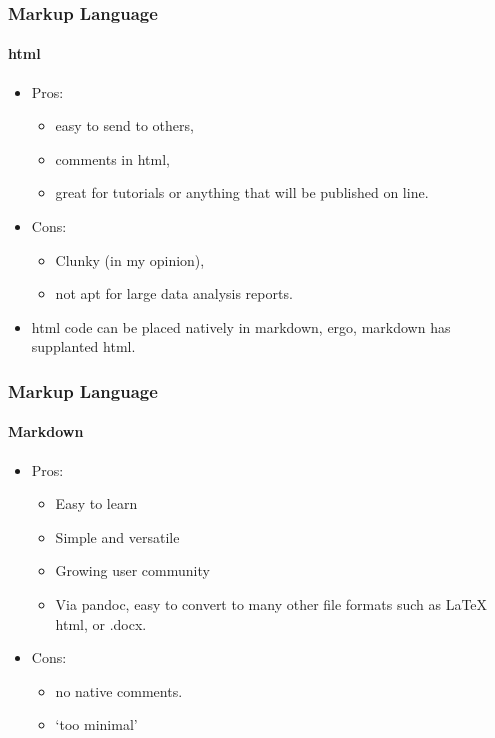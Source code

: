 \documentclass[t]{beamer}\usepackage[]{graphicx}\usepackage[]{color}
\begin{document}
\begin{frame}
  \frametitle{Markup Language}
  \framesubtitle{html}
  \begin{itemize}
    \item Pros: 
      \begin{itemize}
        \item easy to send to others, 
        \item comments in html, 
        \item great for tutorials or anything that will be published on line.
      \end{itemize}
    \item Cons: 
      \begin{itemize}
        \item Clunky (in my opinion), 
        \item not apt for large data analysis reports.
      \end{itemize}

    \item html code can be placed natively in markdown, ergo, markdown has
      supplanted html.
  \end{itemize}
\end{frame}

\begin{frame}
  \frametitle{Markup Language}
  \framesubtitle{Markdown}
  \begin{itemize}
    \item Pros: 
      \begin{itemize}
        \item Easy to learn 
        \item Simple and versatile
        \item Growing user community  
        \item Via pandoc, easy to convert to many other file formats such as
          \LaTeX\, html, or .docx.
      \end{itemize}
    \item Cons: 
      \begin{itemize}
        \item no native comments.  
        \item `too minimal'
      \end{itemize}
  \end{itemize}
\end{frame}
\end{document}
